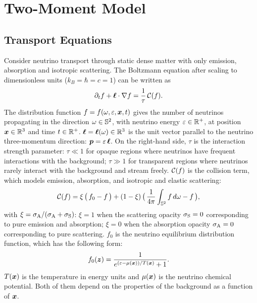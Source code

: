 \section{Two-Moment Model}\label{se:Two-MomentModel}

\subsection{Transport Equations}
Consider neutrino transport through static dense matter with only emission, absorption and isotropic scattering.
The Boltzmann equation after scaling to dimensionless units ($k_{B} = \hbar = c = 1$) can be written as
\begin{equation}
  \pd{f}{t}+\vect{\ell}\cdot\nabla f
  =\f{1}{\tau}\,\cC(f).
  \label{eq:boltzmann}
\end{equation}
The distribution function $f = f(\omega,\varepsilon,\boldsymbol{x},t)$ gives the number of neutrinos propagating in the direction $\omega\in\mathbb{S}^{2}$, with neutrino energy $\varepsilon\in\mathbb{R}^{+}$, at position $\boldsymbol{x}\in\mathbb{R}^{3}$ and time $t\in\mathbb{R}^{+}$.  
$\boldsymbol{\ell} = \boldsymbol{\ell}(\omega)\in\mathbb{R}^{3}$ is the unit vector parallel to the neutrino three-momentum direction: $\boldsymbol{p}=\varepsilon\,\boldsymbol{\ell}$.
On the right-hand side, $\tau$ is the interaction strength parameter: $\tau\ll1$ for opaque regions where neutrinos have frequent interactions with the background; $\tau\gg1$ for transparent regions where neutrinos rarely interact with the background and stream freely.
$\mathcal{C}(f)$ is the collision term, which models emission, absorption, and isotropic and elastic scattering: 
\begin{equation}
  \cC(f)=\xi\,\big(\,f_{0}-f\,\big)
  +(1-\xi)\,\big(\,\f{1}{4\pi}\int_{\bbS^{2}}f\,d\omega-f\,\big),
  \label{eq:collisionTerm}
\end{equation}
with $\xi = \sigma_{{\rm A}} / (\sigma_{{\rm A}}  + \sigma_{{\rm S}} )$: $\xi = 1$ when the scattering opacity $\sigma_{{\rm S}} = 0$ corresponding to pure emission and absorption; $\xi = 0$ when the absorption opacity $\sigma_{{\rm A}} = 0$ corresponding to pure scattering. 
$f_{0}$ is the neutrino equilibrium distribution function, which has the following form:
\begin{equation}
  f_{0}(\vect{z})=\f{1}{e^{(\varepsilon-\mu(\vect{x}))/T(\vect{x})}+1}.
  \label{eq:fermiDirac}
\end{equation}
$T(\boldsymbol{x})$ is the temperature in energy units and $\mu(\boldsymbol{x})$ is the neutrino chemical potential.
Both of them depend on the properties of the background as a function of $\boldsymbol{x}$.

